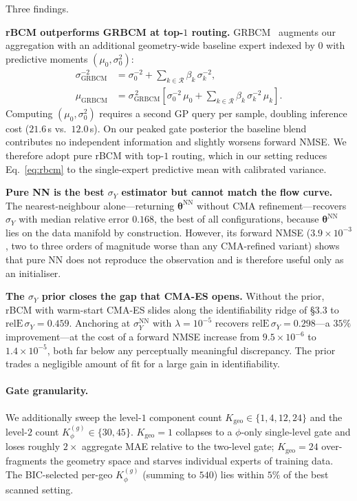 Three findings.

\textbf{rBCM outperforms GRBCM at top-$1$ routing.}
GRBCM~\cite{liu2018generalized} augments our aggregation with an
additional geometry-wide baseline expert indexed by $0$ with
predictive moments $(\mu_0, \sigma_0^{2})$:
\begin{align}
\label{eq:grbcm}
    \sigma_{\mathrm{GRBCM}}^{-2}
    &= \sigma_0^{-2}
       + \sum_{k \in \mathcal{R}} \beta_k\,\sigma_k^{-2},
\nonumber\\
    \mu_{\mathrm{GRBCM}}
    &= \sigma_{\mathrm{GRBCM}}^{\,2}\!
       \left[\sigma_0^{-2}\,\mu_0
           + \sum_{k \in \mathcal{R}}
               \beta_k\,\sigma_k^{-2}\,\mu_k\right].
\end{align}
Computing $(\mu_0, \sigma_0^2)$ requires a second GP query per
sample, doubling inference cost ($21.6$\,s vs.\ $12.0$\,s). On our
peaked gate posterior the baseline blend contributes no independent
information and slightly worsens forward NMSE. We therefore adopt
pure rBCM with top-$1$ routing, which in our setting reduces
Eq.~\eqref{eq:rbcm} to the single-expert predictive mean with
calibrated variance.

\textbf{Pure NN is the best $\sigma_Y$ estimator but cannot match the
flow curve.} The nearest-neighbour alone---returning
$\boldsymbol{\theta}^{\mathrm{NN}}$ without CMA refinement---recovers
$\sigma_Y$ with median relative error $0.168$, the best of all
configurations, because $\boldsymbol{\theta}^{\mathrm{NN}}$ lies on
the data manifold by construction. However, its forward NMSE
($3.9\times 10^{-3}$, two to three orders of magnitude worse than
any CMA-refined variant) shows that pure NN does not reproduce the
observation and is therefore useful only as an initialiser.

\textbf{The $\sigma_Y$ prior closes the gap that CMA-ES opens.}
Without the prior, rBCM with warm-start CMA-ES slides along the
identifiability ridge of \S3.3 to
$\mathrm{relE}\,\sigma_Y = 0.459$. Anchoring at
$\sigma_Y^{\mathrm{NN}}$ with $\lambda = 10^{-5}$ recovers
$\mathrm{relE}\,\sigma_Y = 0.298$---a $35\%$ improvement---at the
cost of a forward NMSE increase from $9.5\times 10^{-6}$ to
$1.4\times 10^{-5}$, both far below any perceptually meaningful
discrepancy. The prior trades a negligible amount of fit for a
large gain in identifiability.

\paragraph{Gate granularity.}
We additionally sweep the level-$1$ component count
$K_{\mathrm{geo}} \in \{1, 4, 12, 24\}$ and the level-$2$ count
$K_{\phi}^{(g)} \in \{30, 45\}$. $K_{\mathrm{geo}} = 1$ collapses to
a $\phi$-only single-level gate and loses roughly $2\times$
aggregate MAE relative to the two-level gate; $K_{\mathrm{geo}} = 24$
over-fragments the geometry space and starves individual experts of
training data. The BIC-selected per-geo $K_{\phi}^{(g)}$ (summing to
$540$) lies within $5\%$ of the best scanned setting.


